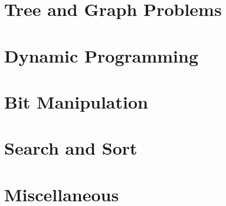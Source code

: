 \chapter{Tree and Graph Problems}











\chapter{Dynamic Programming}









\chapter{Bit Manipulation}






\chapter{Search and Sort}








\chapter{Miscellaneous}






